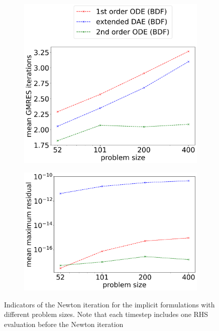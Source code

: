 \begin{figure}[H]
\begin{subfigure}[b]{0.32\textwidth}
		\includegraphics[width=1.03\textwidth]{images/TANDEM_averageNumberKSPIteration.png}
	\end{subfigure}
	\begin{subfigure}[b]{0.32\textwidth}
		\centering
		\includegraphics[width=1\textwidth]{images/TANDEM_maximumResidualNorm.png}
	\end{subfigure}
	\caption{Indicators of the Newton iteration for the implicit formulations with different problem sizes. Note that each timestep includes one RHS evaluation before the Newton iteration}
	\label{fig:implicit_methods_scalabilty_iterations}
\end{figure}

